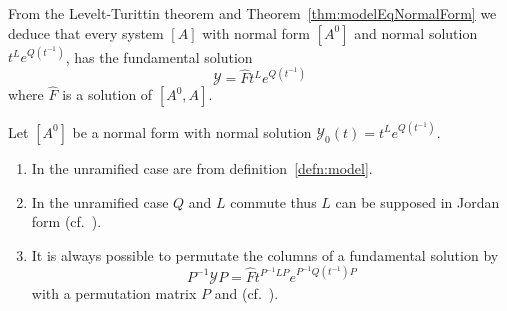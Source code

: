 \begin{cor}
  From the Levelt-Turittin theorem and Theorem~\ref{thm:modelEqNormalForm} we
  deduce that every system $[A]$ with normal form $[A^0]$ and normal solution
  $t^L e^{Q(t^{-1})}$, has the fundamental solution
  \[
    \mathcal{Y}=\hat F t^L e^{Q(t^{-1})}
  \]
  where $\hat F$ is a solution of $[A^0,A]$.
\end{cor}

\begin{rem}
  Let $[A^0]$ be a normal form with normal solution
  $\mathcal{Y}_0(t)=t^L e^{Q(t^{-1})}$.
  \begin{enumerate}
    \item In the unramified case are  from definition~\ref{defn:model}.
    \item In the unramified case $Q$ and $L$ commute thus $L$ can be supposed
      in Jordan form (cf.\ \cite[Sec.4]{Martinet1991}).
    \item It is always possible to permutate the columns of a fundamental
      solution by
      \[
        P^{-1}\mathcal{Y}P=\hat F t^{P^{-1}LP} e^{P^{-1}Q(t^{-1})P}
      \]
      with a permutation matrix $P$ and  (cf.\ \cite[73]{Loday2014}).
  \end{enumerate}
\end{rem}

